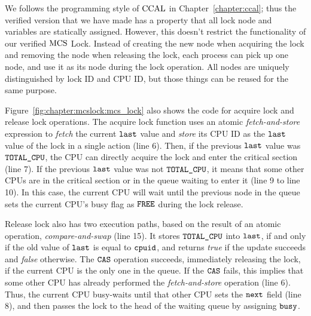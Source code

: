 We follows the programming style of $\mathrm{CCAL}$ in Chapter~\ref{chapter:ccal}; thus
the verified version that we have made has a property that all lock node and variables are statically assigned.
However, this doesn't restrict the functionality of our verified $\mathrm{MCS}$ Lock.
Instead of creating the new node when acquiring the lock and removing the node when releasing the lock,
each process can pick up one node, and use it as its node during the lock operation. 
All nodes are uniquely distinguished by lock ID and CPU ID, but those
things can be reused for the same purpose.

Figure~\ref{fig:chapter:mcslock:mcs_lock} also shows the code for  acquire lock and
release lock operations.  The acquire lock function uses an atomic {\em
fetch-and-store} expression to {\em fetch} the current ${\mathrm{\texttt{last}}}$
value and {\em store} its CPU ID as the ${\mathrm{\texttt{last}}}$ value of
the lock in a single action (line 6).  Then, if the previous ${\mathrm{\texttt{last}}}$ value
was ${\mathrm{\texttt{TOTAL\_CPU}}}$, the CPU can directly acquire the lock and enter the
critical section (line 7).  If the previous ${\mathrm{\texttt{last}}}$ value was not
${\mathrm{\texttt{TOTAL\_CPU}}}$, it means that some other CPUs are in the critical
section or in the queue waiting to enter it (line 9 to line 10).  In
this case, the current CPU will wait until the previous node in the
queue sets the current CPU's busy flag as ${\mathrm{\texttt{FREE}}}$ during the lock
release.

Release lock also has two execution paths, based on the result of an atomic operation, {\em compare-and-swap} (line 15).
It stores ${\mathrm{\texttt{TOTAL\_CPU}}}$ into ${\mathrm{\texttt{last}}}$, if and only if the old value
of ${\mathrm{\texttt{last}}}$ is equal to ${\mathrm{\texttt{cpuid}}}$, and returns {\em
  true} if the update succeeds and {\em false} otherwise.
The ${\mathrm{\texttt{CAS}}}$ operation succeeds, immediately releasing the lock,
if the current CPU is the only one in the queue.
If the ${\mathrm{\texttt{CAS}}}$ fails, this implies that some other CPU has
already performed the {\em fetch-and-store} operation (line 6). Thus, the current CPU busy-waits until that other CPU sets the
${\mathrm{\texttt{next}}}$ field  (line 8), and then passes the lock to the head of the
waiting queue by assigning ${\mathrm{\texttt{busy}}}$.


